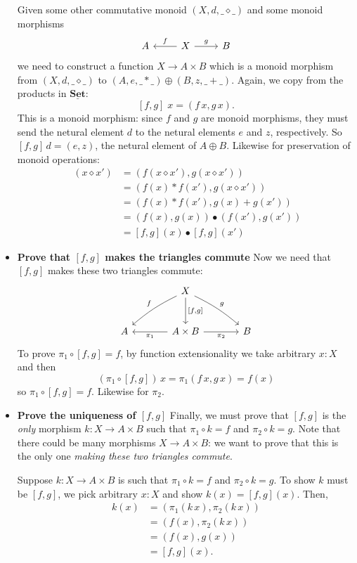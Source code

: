 \documentclass{article}
\newcommand{\cat}[1]{\underline{\mathbf{#1}}}
\begin{document}
\begin{Answer}
\begin{itemize}
      Given some other commutative monoid $(X,d,\_\diamond\_)$ and some monoid morphisms
      \[ \begin{tikzcd}  A & X \arrow[swap]{l}{f} \arrow{r}{g} & B \end{tikzcd}  \]
      we need to construct a function $X\to A\times B$ which is a monoid morphism from $(X,d,\_\diamond\_)$ to $(A,e,\_*\_)\oplus(B,z,\_+\_)$. Again, we copy from the products in $\cat{Set}$:
      \[  [f,g]\;x = (f\,x, g\,x). \]
      This is a monoid morphism: since $f$ and $g$ are monoid morphisms, they must send the netural element $d$ to the netural elements $e$ and $z$, respectively. So $[f,g]\,d=(e,z)$, the netural element of $A\oplus B$. Likewise for preservation of monoid operations:
      \begin{align*}
        [f,g]\;(x\diamond x')
          &= (f(x\diamond x'), g(x\diamond x')) \tag{Defn. $[f,g]$}\\
          &= (f(x) * f(x'),g(x\diamond x')) \tag{$f$ is a morphism}\\
          &= (f(x) * f(x'),g(x) + g(x')) \tag{$g$ is a morphism}\\
          &= (f(x),g(x)) \bullet (f(x'),g(x')) \tag{Defn. $\bullet$}\\
          &= [f,g](x) \bullet [f,g](x') \tag{Defn. $[f,g]$}
      \end{align*}
      \item \textbf{Prove that $[f,g]$ makes the triangles commute}
      Now we need that $[f,g]$ makes these two triangles commute:
      \[ \begin{tikzcd}[sep=large]
          & X \arrow[swap,bend right=7]{dl}{f} \arrow[bend left=7]{dr}{g} \arrow{d}{[f,g]}\\
          A & A\times B \arrow{l}{\pi_1}\arrow[swap]{r}{\pi_2} & B
      \end{tikzcd} \]
      To prove $\pi_1\circ [f,g]=f$, by function extensionality we take arbitrary $x:X$ and then
      \[ (\pi_1\circ[f,g])\,x = \pi_1(f\,x, g\,x) = f(x) \]
      so $\pi_1\circ [f,g]=f$. Likewise for $\pi_2$.
      \item \textbf{Prove the uniqueness of $[f,g]$}
      Finally, we must prove that $[f,g]$ is the \emph{only} morphism $k\colon X\to A\times B$ such that $\pi_1\circ k = f$ and $\pi_2\circ k=g$. Note that there could be many morphisms $X\to A\times B$: we want to prove that this is the only one \emph{making these two triangles commute}.
      
      Suppose $k\colon X\to A\times B$ is such that $\pi_1\circ k = f$ and $\pi_2\circ k=g$. To show $k$ must be $[f,g]$, we pick arbitrary $x:X$ and show $k(x)=[f,g](x)$. Then,
      \begin{align*}
        k(x)
          &= (\pi_1(k\,x),\pi_2(k\,x))\\
          &= (f(x),\pi_2(k\,x)) \tag{$\pi_1\circ k=f$}\\
          &= (f(x),g(x)) \tag{$\pi_2\circ k=g$}\\
          &= [f,g](x).
      \end{align*}
    \end{itemize}
\end{Answer}
\end{document}
